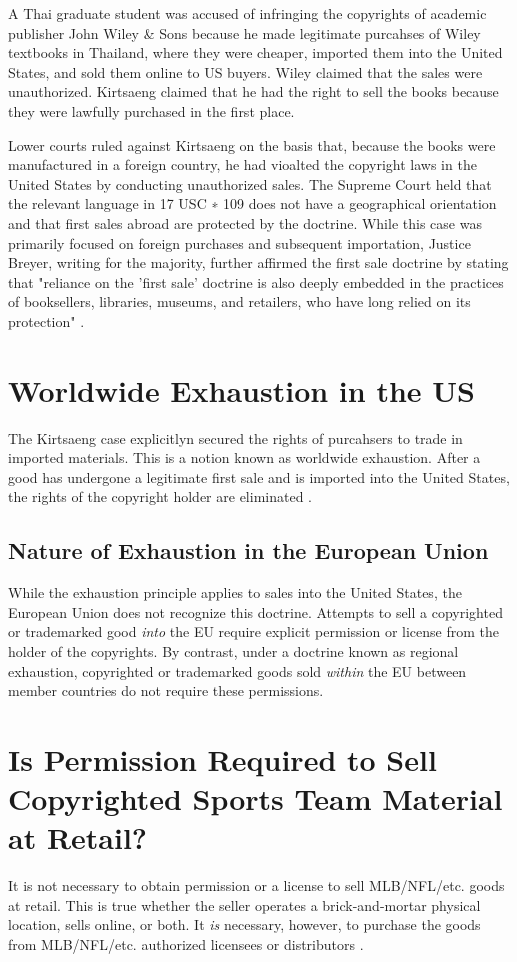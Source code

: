 \documentclass[letterpaper,11pt]{texMemo}
\begin{document}
    A Thai graduate student was accused of infringing the copyrights of academic publisher John Wiley \& Sons because he made legitimate purcahses of Wiley textbooks in Thailand, where they were cheaper, imported them into the United States, and sold them online to US buyers. Wiley claimed that the sales were unauthorized. Kirtsaeng claimed that he had the right to sell the books because they were lawfully purchased in the first place.

    Lower courts ruled against Kirtsaeng on the basis that, because the books were manufactured in a foreign country, he had vioalted the copyright laws in the United States by conducting unauthorized sales. The Supreme Court held that the relevant language in 17 USC \textsection∗ 109 does not have a geographical orientation and that first sales abroad are protected by the doctrine. While this case was primarily focused on foreign purchases and subsequent importation, Justice Breyer, writing for the majority, further affirmed the first sale doctrine by stating that "reliance on the 'first sale' doctrine is also deeply embedded in the practices of booksellers, libraries, museums, and retailers, who have long relied on its protection" \cite{kirtsaeng2016}.

  \section*{Worldwide Exhaustion in the US}
    The Kirtsaeng case explicitlyn secured the rights of purcahsers to trade in imported materials. This is a notion known as worldwide exhaustion. After a good has undergone a legitimate first sale and is imported into the United States, the rights of the copyright holder are eliminated \cite{ownersrights}.

    \subsection*{Nature of Exhaustion in the European Union}
      While the exhaustion principle applies to sales into the United States, the European Union does not recognize this doctrine. Attempts to sell a copyrighted or trademarked good \emph{into} the EU require explicit permission or license from the holder of the copyrights. By contrast, under a doctrine known as regional exhaustion, copyrighted or trademarked goods sold \emph{within} the EU between member countries do not require these permissions.

\section*{Is Permission Required to Sell Copyrighted Sports Team Material at Retail?}
  It is not necessary to obtain permission or a license to sell MLB/NFL/etc. goods at retail. This is true whether the seller operates a brick-and-mortar physical location, sells online, or both. It \emph{is} necessary, however, to purchase the goods from MLB/NFL/etc. authorized licensees or distributors \cite{licensedsports}.
\end{document}
